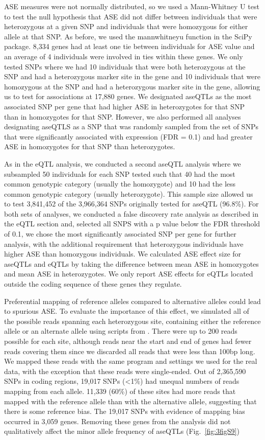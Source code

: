 ASE measures were not normally distributed, so we used a Mann-Whitney U test to test the null hypothesis that ASE did not differ between individuals that were heterozygous at a given SNP and individuals that were homozygous for either allele at that SNP. As before, we used the mannwhitneyu function in the SciPy package. 8,334 genes had at least one tie between individuals for ASE value and an average of 4 individuals were involved in ties within these genes. We only tested SNPs where we had 10 individuals that were both heterozygous at the SNP and had a heterozygous marker site in the gene and 10 individuals that were homozygous at the SNP and had a heterozygous marker site in the gene, allowing us to test for associations at 17,880 genes. We designated aseQTLs as the most associated SNP per gene that had higher ASE in heterozygotes for that SNP than in homozygotes for that SNP. However, we also performed all analyses designating aseQTLS as a SNP that was randomly sampled from the set of SNPs that were significantly associated with expression (FDR = 0.1) and had greater ASE in homozygotes for that SNP than heterozygotes.

As in the eQTL analysis, we conducted a second aseQTL analysis where we subsampled 50 individuals for each SNP tested such that 40 had the most common genotypic category (usually the homozygote) and 10 had the less common genotypic category (usually heterozygote). This sample size allowed us to test 3,841,452 of the 3,966,364 SNPs originally tested for aseQTL (96.8\%). For both sets of analyses, we conducted a false discovery rate analysis as described in the eQTL section and, selected all SNPS with a p value below the FDR threshold of 0.1, we chose the most significantly associated SNP per gene for further analysis, with the additional requirement that heterozygous individuals have higher ASE than homozygous individuals. We calculated ASE effect size for aseQTLs and eQTLs by taking the difference between mean ASE in homozygotes and mean ASE in heterozygotes. We only report ASE effects for eQTLs located outside the coding sequence of these genes they regulate.

Preferential mapping of reference alleles compared to alternative alleles could lead to spurious ASE. To evaluate the importance of this effect, we simulated all of the possible reads spanning each heterozygous site, containing either the reference allele or an alternate allele using scripts from \citep{Degner2009-nj}. There were up to 200 reads possible for each site, although reads near the start and end of genes had fewer reads covering them since we discarded all reads that were less than 100bp long. We mapped these reads with the same program and settings we used for the real data, with the exception that these reads were single-ended.  Out of 2,365,590 SNPs in coding regions, 19,017 SNPs (\textless1\%) had unequal numbers of reads mapping from each allele. 11,339 (60\%) of these sites had more reads that mapped with the reference allele than with the alternative allele, suggesting that there is some reference bias. The 19,017 SNPs with evidence of mapping bias occurred in 3,059 genes. Removing these genes from the analysis did not qualitatively affect the minor allele frequency of aseQTLs (Fig.~\ref{fig:3figS9})


